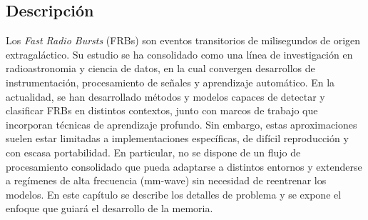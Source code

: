 % 
% 
% 
% 
% 
\subsection{Descripción}

Los \textit{Fast Radio Bursts} (FRBs) son  eventos transitorios  de milisegundos de origen extragaláctico. Su estudio se ha consolidado como una línea de investigación en radioastronomia y ciencia de datos, en la cual convergen desarrollos de instrumentación, procesamiento de señales y aprendizaje automático. En la actualidad, se han desarrollado métodos y modelos capaces de detectar y clasificar FRBs en distintos contextos, junto con marcos de trabajo que incorporan técnicas de aprendizaje profundo. Sin embargo, estas aproximaciones suelen estar limitadas a implementaciones específicas, de difícil reproducción y con escasa portabilidad. En particular, no se dispone de un flujo de procesamiento consolidado que pueda adaptarse a distintos entornos y extenderse a regímenes de alta frecuencia (mm-wave) sin necesidad de reentrenar los modelos. En este capítulo se describe los detalles de problema y se expone el enfoque que guiará el desarrollo de la memoria.




